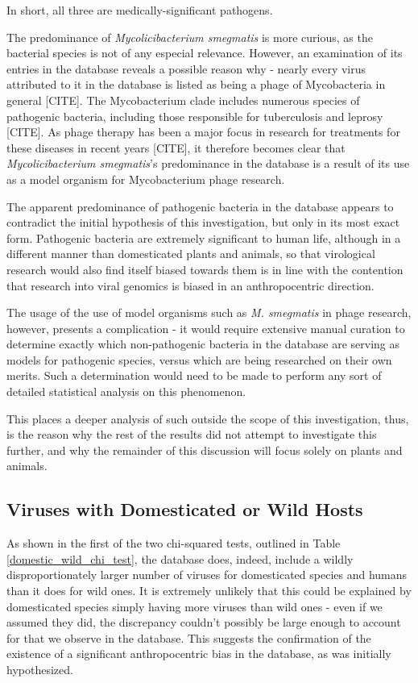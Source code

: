 \documentclass[12pt]{article}
\begin{document}
    In short, all three are medically-significant pathogens.

    The predominance of \emph{Mycolicibacterium smegmatis} is more curious, as the
    bacterial species is not of any especial relevance. However, an examination of 
    its entries in the database reveals a possible reason why - nearly every virus
    attributed to it in the database is listed as being a phage of Mycobacteria in
    general [CITE]. The Mycobacterium clade includes numerous species of pathogenic
    bacteria, including those responsible for tuberculosis and leprosy [CITE]. As 
    phage therapy has been a major focus in research for treatments for these
    diseases in recent years [CITE], it therefore becomes clear that
    \emph{Mycolicibacterium smegmatis}'s predominance in the database is a result
    of its use as a model organism for Mycobacterium phage research.

    The apparent predominance of pathogenic bacteria in the database appears
    to contradict the initial hypothesis of this investigation, but only in its
    most exact form. Pathogenic bacteria are extremely significant to human life,
    although in a different manner than domesticated plants and animals,
    so that virological research would also find itself biased towards them is in
    line with the contention that research into viral genomics is biased in an
    anthropocentric direction.

    The usage of the use of model organisms such as \emph{M. smegmatis} in phage
    research, however, presents a complication - it would require extensive manual
    curation to determine exactly which non-pathogenic bacteria in the database
    are serving as models for pathogenic species, versus which are being researched
    on their own merits. Such a determination would need to be made to perform any
    sort of detailed statistical analysis on this phenomenon.

    This places a deeper analysis of such outside the scope of this investigation,
    thus, is the reason why the rest of the results did not attempt to investigate
    this further, and why the remainder of this discussion will focus solely on
    plants and animals.

    \subsection{Viruses with Domesticated or Wild Hosts}

    As shown in the first of the two chi-squared tests, outlined in Table
    \ref{domestic_wild_chi_test}, the database does, indeed, include a wildly
    disproportionately larger number of viruses for domesticated species and
    humans than it does for wild ones. It is extremely unlikely that this could
    be explained by domesticated species simply having more viruses than wild
    ones - even if we assumed they did, the discrepancy couldn't possibly be
    large enough to account for that we observe in the database. This suggests
    the confirmation of the existence of a significant anthropocentric bias
    in the database, as was initially hypothesized.
\end{document}
